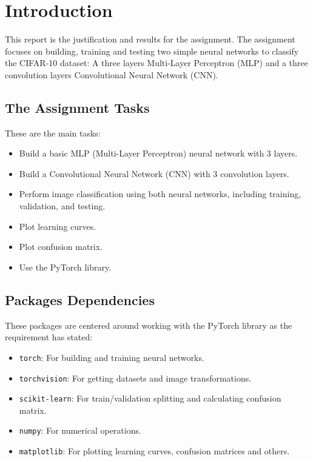 \documentclass{report}
\begin{document}
\chapter*{Introduction}
This report is the justification and results for the assignment. The assignment focuses on building, training and 
testing two simple neural networks to classify the CIFAR-10 dataset: A three layers Multi-Layer Perceptron 
(MLP) and a three convolution layers Convolutional Neural Network (CNN).

\section*{The Assignment Tasks}
These are the main tasks:
\begin{itemize}
    \item Build a basic MLP (Multi-Layer Perceptron) neural network with 3 layers.
    \item Build a Convolutional Neural Network (CNN) with 3 convolution layers.
    \item Perform image classification using both neural networks, including training, validation, and testing.
    \item Plot learning curves.
    \item Plot confusion matrix.
    \item Use the PyTorch library.
\end{itemize}

\section*{Packages Dependencies}
These packages are centered around working with the PyTorch library as the requirement has stated:
\begin{itemize}
    \item \texttt{torch}: For building and training neural networks.
    \item \texttt{torchvision}: For getting datasets and image transformations.
    \item \texttt{scikit-learn}: For train/validation splitting and calculating confusion matrix.
    \item \texttt{numpy}: For numerical operations.
    \item \texttt{matplotlib}: For plotting learning curves, confusion matrices and others.
\end{itemize}

\newpage
\tableofcontents
\newpage
\end{document}
